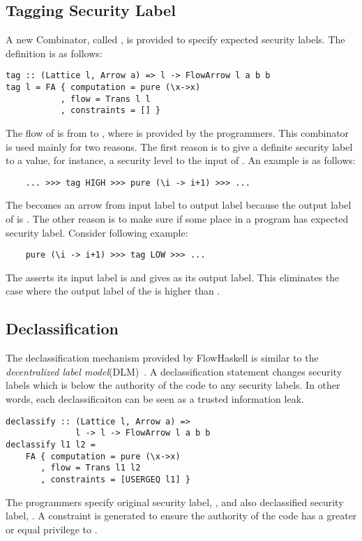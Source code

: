 \subsection{Tagging Security Label}
A new Combinator, called , is provided to specify expected security labels. The
definition is as follows:
\begin{verbatim}
tag :: (Lattice l, Arrow a) => l -> FlowArrow l a b b
tag l = FA { computation = pure (\x->x)
           , flow = Trans l l
           , constraints = [] }
\end{verbatim}
The flow of  is from  to , where  is provided by the programmers.
This combinator is used mainly for two reasons. 
The first reason is to give a definite security label to a value, 
for instance, a security level to the input of . An example is as follows:
\begin{verbatim}
    ... >>> tag HIGH >>> pure (\i -> i+1) >>> ...
\end{verbatim}
The  becomes an arrow from input label  to output label  because the 
output label of  is .
The other reason is to make sure if some place in a program has expected security label. 
Consider following example:
\begin{verbatim}
    pure (\i -> i+1) >>> tag LOW >>> ...
\end{verbatim}
The  asserts its input label is  and gives  as its output label.
This eliminates the case where the output label of the  is higher than .
\subsection{Declassification}
The declassification mechanism provided by FlowHaskell is similar to the 
{\em decentralized label model}(DLM)~\cite{Myers:Liskov:TSEM2000}.
A declassification statement changes security labels which is below the authority of the 
code to any security labels.
In other words, each declassificaiton can be seen as a trusted information leak. 
\begin{verbatim}
declassify :: (Lattice l, Arrow a) => 
              l -> l -> FlowArrow l a b b
declassify l1 l2 =
    FA { computation = pure (\x->x)
       , flow = Trans l1 l2
       , constraints = [USERGEQ l1] }
\end{verbatim}
The programmers specify original security label, , and also declassified security
label, . A constraint  is 
generated to ensure the authority of the code has a greater or equal privilege to .

